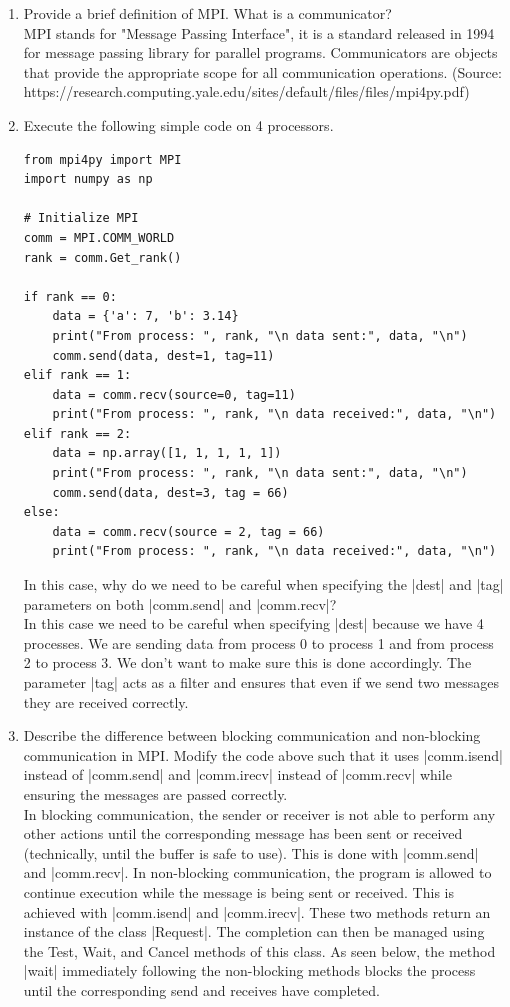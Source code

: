 \documentclass[11pt]{article}
\begin{document}
\begin{enumerate}
    \item Provide a brief definition of MPI. What is a communicator? \\
    MPI stands for "Message Passing Interface", it is a standard released in 1994 for message passing library for parallel programs. Communicators are objects that provide the appropriate scope for all communication operations. (Source: https://research.computing.yale.edu/sites/default/files/files/mpi4py.pdf)
    \item Execute the following simple code on 4 processors. 
    \begin{verbatim}
from mpi4py import MPI
import numpy as np

# Initialize MPI
comm = MPI.COMM_WORLD
rank = comm.Get_rank()

if rank == 0:
    data = {'a': 7, 'b': 3.14}
    print("From process: ", rank, "\n data sent:", data, "\n")
    comm.send(data, dest=1, tag=11)
elif rank == 1:
    data = comm.recv(source=0, tag=11)
    print("From process: ", rank, "\n data received:", data, "\n")
elif rank == 2:
    data = np.array([1, 1, 1, 1, 1])
    print("From process: ", rank, "\n data sent:", data, "\n")
    comm.send(data, dest=3, tag = 66)
else:
    data = comm.recv(source = 2, tag = 66)
    print("From process: ", rank, "\n data received:", data, "\n")
    \end{verbatim}
    In this case, why do we need to be careful when specifying the |dest| and |tag| parameters on both |comm.send| and |comm.recv|? \\
    In this case we need to be careful when specifying |dest| because we have 4 processes. We are sending data from process 0 to process 1 and from process 2 to process 3. We don't want to make sure this is done accordingly. The parameter |tag| acts as a filter and ensures that even if we send two messages they are received correctly.
    \item Describe the difference between blocking communication and non-blocking communication in MPI. Modify the code above such that it uses |comm.isend| instead of |comm.send| and |comm.irecv| instead of |comm.recv| while ensuring the messages are passed correctly. \\
    In blocking communication, the sender or receiver is not able to perform any other actions until the corresponding message has been sent or received (technically, until the buffer is safe to use). This is done with |comm.send| and |comm.recv|. In non-blocking communication, the program is allowed to continue execution while the message is being sent or received. This is achieved with |comm.isend| and |comm.irecv|. These two methods return an instance of the class |Request|. The completion can then be managed using the Test, Wait, and Cancel methods of this class. As seen below, the method |wait| immediately following the non-blocking methods blocks the process until the corresponding send and receives have completed.
    
\end{enumerate}
\end{document}
